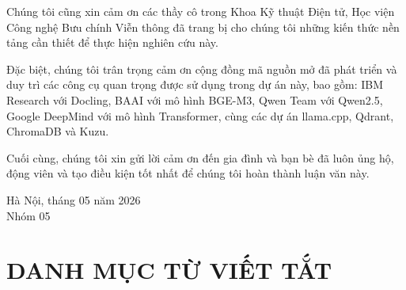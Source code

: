 \documentclass[12pt, a4paper]{report}
\begin{document}
Chúng tôi cũng xin cảm ơn các thầy cô trong Khoa Kỹ thuật Điện tử, Học viện Công nghệ Bưu chính Viễn thông đã trang bị cho chúng tôi những kiến thức nền tảng cần thiết để thực hiện nghiên cứu này.

Đặc biệt, chúng tôi trân trọng cảm ơn cộng đồng mã nguồn mở đã phát triển và duy trì các công cụ quan trọng được sử dụng trong dự án này, bao gồm: IBM Research với Docling, BAAI với mô hình BGE-M3, Qwen Team với Qwen2.5, Google DeepMind với mô hình Transformer, cùng các dự án llama.cpp, Qdrant, ChromaDB và Kuzu.

Cuối cùng, chúng tôi xin gửi lời cảm ơn đến gia đình và bạn bè đã luôn ủng hộ, động viên và tạo điều kiện tốt nhất để chúng tôi hoàn thành luận văn này.

\vspace{1cm}

\begin{flushright}
    Hà Nội, tháng 05 năm 2026\\
    Nhóm 05
\end{flushright}

\newpage

\tableofcontents
\newpage

\chapter*{DANH MỤC TỪ VIẾT TẮT}
\end{document}
